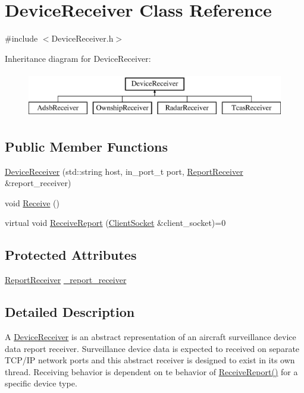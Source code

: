 \hypertarget{class_device_receiver}{}\section{Device\+Receiver Class Reference}
\label{class_device_receiver}


{\ttfamily \#include $<$Device\+Receiver.\+h$>$}

Inheritance diagram for Device\+Receiver\+:\begin{figure}[H]
\begin{center}
\leavevmode
\includegraphics[height=2.000000cm]{class_device_receiver}
\end{center}
\end{figure}
\subsection*{Public Member Functions}
\begin{DoxyCompactItemize}
\item 
\hyperlink{class_device_receiver_ab9a0a8ba1d462e60f86bdd2a1278d75d}{Device\+Receiver} (std\+::string host, in\+\_\+port\+\_\+t port, \hyperlink{class_report_receiver}{Report\+Receiver} \&report\+\_\+receiver)
\item 
void \hyperlink{class_device_receiver_aaf04b5a1969858d970fac17610139c27}{Receive} ()
\item 
virtual void \hyperlink{class_device_receiver_ac60e55ea6cbd0df590204336b50ce7eb}{Receive\+Report} (\hyperlink{class_client_socket}{Client\+Socket} \&client\+\_\+socket)=0
\end{DoxyCompactItemize}
\subsection*{Protected Attributes}
\begin{DoxyCompactItemize}
\item 
\hyperlink{class_report_receiver}{Report\+Receiver} \hyperlink{class_device_receiver_a8dbbb8f8dbcca609735639a91f38b710}{\+\_\+report\+\_\+receiver}
\end{DoxyCompactItemize}


\subsection{Detailed Description}
A \hyperlink{class_device_receiver}{Device\+Receiver} is an abstract representation of an aircraft surveillance device data report receiver. Surveillance device data is expected to received on separate T\+C\+P/\+I\+P network ports and this abstract receiver is designed to exist in it\textquotesingle{}s own thread. Receiving behavior is dependent on te behavior of \hyperlink{class_device_receiver_ac60e55ea6cbd0df590204336b50ce7eb}{Receive\+Report()} for a specific device type. 

